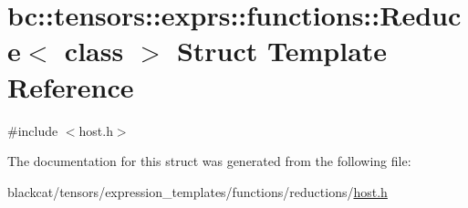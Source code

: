 \hypertarget{structbc_1_1tensors_1_1exprs_1_1functions_1_1Reduce}{}\section{bc\+:\+:tensors\+:\+:exprs\+:\+:functions\+:\+:Reduce$<$ class $>$ Struct Template Reference}
\label{structbc_1_1tensors_1_1exprs_1_1functions_1_1Reduce}


{\ttfamily \#include $<$host.\+h$>$}



The documentation for this struct was generated from the following file\+:\begin{DoxyCompactItemize}
\item 
blackcat/tensors/expression\+\_\+templates/functions/reductions/\hyperlink{tensors_2expression__templates_2functions_2reductions_2host_8h}{host.\+h}\end{DoxyCompactItemize}
